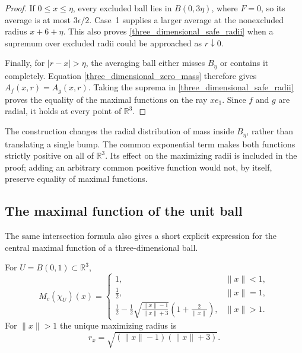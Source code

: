\documentclass[12pt]{amsart}
\numberwithin{equation}{section}
\begin{document}
\begin{proof}
If $0\leq x\leq\eta$, every excluded ball lies in $B(0,3\eta)$,
where $F=0$, so its average is at most $3\epsilon/2$. Case~1 supplies
a larger average at the nonexcluded radius $x+6+\eta$. This also
proves \eqref{three_dimensional_safe_radii} when a supremum over
excluded radii could be approached as $r\downarrow0$.

Finally, for $|r-x|>\eta$, the averaging ball either misses $B_\eta$
or contains it completely. Equation \eqref{three_dimensional_zero_mass}
therefore gives $A_f(x,r)=A_g(x,r)$. Taking the suprema in
\eqref{three_dimensional_safe_radii} proves the equality of the maximal
functions on the ray $xe_1$. Since $f$ and $g$ are radial, it holds
at every point of $\mathbb{R}^3$.
\end{proof}

\begin{remark}
The construction changes the radial distribution of mass inside
$B_\eta$, rather than translating a single bump. The common
exponential term makes both functions strictly positive on all of
$\mathbb{R}^3$. Its effect on the maximizing radii is included in the
proof; adding an arbitrary common positive function would not, by
itself, preserve equality of maximal functions.
\end{remark}

\subsection{The maximal function of the unit ball}

The same intersection formula also gives a short explicit expression
for the central maximal function of a three-dimensional ball.

\begin{corollary}
For $U=B(0,1)\subset\mathbb{R}^3$,
\begin{equation}
\label{maximal_ball}
M_c(\chi_U)(x)=
\begin{cases}
1,&\|x\|<1,\\[2pt]
\displaystyle\frac12,&\|x\|=1,\\[6pt]
\displaystyle\frac12-\frac12
 \sqrt{\frac{\|x\|-1}{\|x\|+3}}
 \left(1+\frac{2}{\|x\|}\right),&\|x\|>1.
\end{cases}
\end{equation}
For $\|x\|>1$ the unique maximizing radius is
\[
r_x=\sqrt{(\|x\|-1)(\|x\|+3)}.
\]
\end{corollary}
\end{document}
